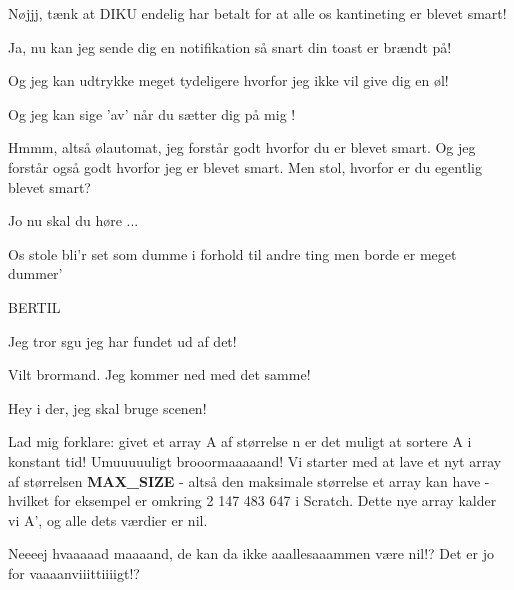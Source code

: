 \documentclass[a4paper,11pt]{article}
\begin{document}
\begin{sketch}


 Nøjjj, tænk at DIKU endelig har betalt for at alle os kantineting er blevet smart!

 Ja, nu kan jeg sende dig en notifikation så snart din toast er brændt på! 

 Og jeg kan udtrykke meget tydeligere hvorfor jeg ikke vil give dig en øl!

 Og jeg kan sige 'av' når du sætter dig på mig !

 Hmmm, altså ølautomat, jeg forstår godt hvorfor du er blevet smart. Og jeg forstår også godt hvorfor jeg er blevet smart. Men stol, hvorfor er du egentlig blevet smart?

 Jo nu skal du høre ...


 Os stole bli'r set som dumme
 i forhold til andre ting
 men borde er meget dummer'



 BERTIL

 Jeg tror sgu jeg har fundet ud af det!

 Vilt brormand. Jeg kommer ned med det samme!

 Hey i der, jeg skal bruge scenen!

 Lad mig forklare: givet et array A af størrelse n er det muligt at sortere A i konstant tid!
 Umuuuuuligt brooormaaaaand!
 Vi starter med at lave et nyt array af størrelsen \textbf{MAX\_SIZE} - altså den maksimale størrelse et array kan have - hvilket for eksempel er omkring 2 147 483 647 i Scratch. Dette nye array kalder vi A’, og alle dets værdier er nil.

 Neeeej hvaaaaad maaaand, de kan da ikke aaallesaaammen være nil!? Det er jo for vaaaanviiittiiiigt!?


\end{sketch}
\end{document}
